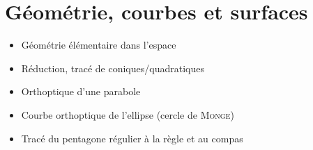 \chapter{Géométrie, courbes et surfaces}

\begin{itemize}
    \item Géométrie élémentaire dans l'espace
    \item Réduction, tracé de coniques/quadratiques
    \item Orthoptique d'une parabole
    \item Courbe orthoptique de l'ellipse (cercle de \textsc{Monge})
    \item Tracé du pentagone régulier à la règle et au compas
\end{itemize}